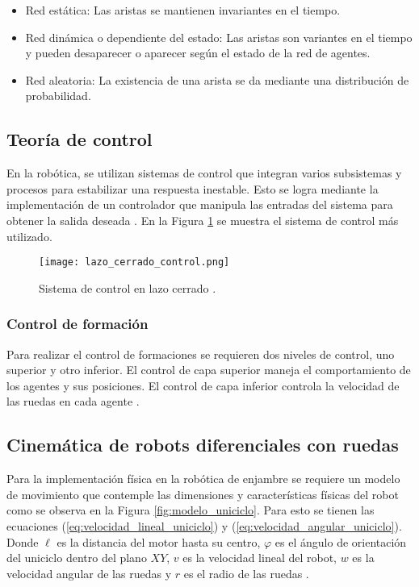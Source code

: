 \begin{itemize}
	\item Red estática: Las aristas se mantienen invariantes en el tiempo.
	\item Red dinámica o dependiente del estado: Las aristas son variantes en el tiempo y pueden desaparecer o aparecer según el estado de la red de agentes.
	\item Red aleatoria: La existencia de una arista se da mediante una distribución de probabilidad.
\end{itemize}

\subsection*{Teoría de control}
En la robótica, se utilizan sistemas de control que integran varios subsistemas y procesos para estabilizar una respuesta inestable. Esto se logra mediante la implementación de un controlador que manipula las entradas del sistema para obtener la salida deseada \cite{control_lazo_cerrado}. En la Figura \ref{fig:lazo_cerrado_control} se muestra el sistema de control más utilizado.

\begin{figure}[H]
	\centering
	\texttt{[image: lazo\_cerrado\_control.png]}
	\caption{Sistema de control en lazo cerrado \cite{control_lazo_cerrado}.}
	\label{fig:lazo_cerrado_control}
\end{figure}

\subsubsection*{Control de formación}
Para realizar el control de formaciones se requieren dos niveles de control, uno superior y otro inferior. El control de capa superior maneja el comportamiento de los agentes y sus posiciones. El control de capa inferior controla la velocidad de las ruedas en cada agente \cite{PenaAM_2019_tesis}.

\subsection*{Cinemática de robots diferenciales con ruedas}
Para la implementación física en la robótica de enjambre se requiere un modelo de movimiento que contemple las dimensiones y características físicas del robot como se observa en la Figura \ref{fig:modelo_uniciclo}. Para esto se tienen las ecuaciones (\ref{eq:velocidad_lineal_uniciclo}) y (\ref{eq:velocidad_angular_uniciclo}). Donde $\ell$ es la distancia del motor hasta su centro, $\varphi$ es el ángulo de orientación del uniciclo dentro del plano $XY$, $v$ es la velocidad lineal del robot, $w$ es la velocidad angular de las ruedas y $r$ es el radio de las ruedas \cite{ZeaM_modelo_uniciclo}.

